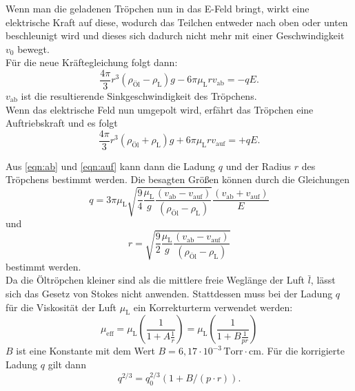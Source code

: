 Wenn man die geladenen Tröpchen nun in das E-Feld bringt, wirkt eine elektrische Kraft auf diese,
wodurch das Teilchen entweder nach oben oder unten beschleunigt wird und dieses sich dadurch
nicht mehr mit einer Geschwindigkeit $v_0$ bewegt.\\
Für die neue Kräftegleichung folgt dann:
\begin{equation}
    \label{eqn:ab}
    \frac{4 \pi}{3} r^3 (\rho_{\mathrm{Öl}} - \rho_{\mathrm{L}}) g - 6 \pi \mu_{\mathrm{L}} r v_{\mathrm{ab}} = -qE.
\end{equation}
$v_{\mathrm{ab}}$ ist die resultierende Sinkgeschwindigkeit des Tröpchens.\\
Wenn das elektrische Feld nun umgepolt wird, erfährt das Tröpchen eine Auftriebskraft und es folgt
\begin{equation}
    \label{eqn:auf}
    \frac{4 \pi}{3} r^3 (\rho_{\mathrm{Öl}} + \rho_{\mathrm{L}}) g + 6 \pi \mu_{\mathrm{L}} r v_{\mathrm{auf}} = +qE.
\end{equation}

Aus \autoref{eqn:ab} und \autoref{eqn:auf} kann dann die Ladung $q$ und der Radius $r$ des Tröpchens
bestimmt werden. Die besagten Größen können durch die Gleichungen
\begin{equation}
    \label{eqn:q}
    q = 3 \pi \mu_{\mathrm{L}} \sqrt{\frac{9}{4}\frac{\mu_{\mathrm{L}}}{g}\frac{(v_{\mathrm{ab}}-v_{\mathrm{auf}})}{(\rho_{\mathrm{Öl}} - \rho_{\mathrm{L}})}}\frac{(v_{\mathrm{ab}}+v_{\mathrm{auf}})}{E}
\end{equation}
und
\begin{equation}
    \label{eqn:r}
    r = \sqrt{\frac{9}{2}\frac{\mu_{\mathrm{L}}}{g}\frac{(v_{\mathrm{ab}}-v_{\mathrm{auf}})}{(\rho_{\mathrm{Öl}} - \rho_{\mathrm{L}})}}
\end{equation}
bestimmt werden.\\
Da die Öltröpchen kleiner sind als die mittlere freie Weglänge der Luft $\bar{l}$, lässt sich das
Gesetz von Stokes nicht anwenden. Stattdessen muss bei der Ladung $q$ für die Viskosität der Luft $\mu_{\mathrm{L}}$
ein Korrekturterm verwendet werden:
\begin{equation}
    \label{eqn:Korrekturterm}
    \mu_{\mathrm{eff}} = \mu_{\mathrm{L}} \left(\frac{1}{1 + A \frac{1}{r}}\right) = \mu_{\mathrm{L}} \left(\frac{1}{1 + B \frac{1}{pr}}\right)
\end{equation}
$B$ ist eine Konstante mit dem Wert $B = 6,17 \cdot 10^{-3} \, \mathrm{Torr \cdot cm}$. Für die korrigierte
Ladung $q$ gilt dann
\begin{equation}
    \label{eqn:qKorr}
    q^{2/3} = q_0^{2/3} (1 + B / (p \cdot r)).
\end{equation}

\cite{sample}
